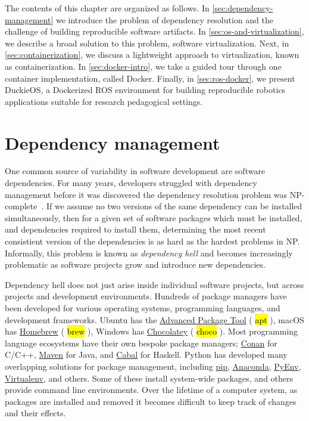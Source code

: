 \documentclass[12pt,initial,twoside,maitrise]{dms}
\newcommand{\inline}[1]{%
\begingroup%
\sethlcolor{slightgray}%
\hl{\ttfamily\small #1}%
\endgroup
}
\numberwithin{equation}{section}
\numberwithin{table}{chapter}
\numberwithin{figure}{chapter}
\begin{document}
The contents of this chapter are organized as follows. In \autoref{sec:dependency-management} we introduce the problem of dependency resolution and the challenge of building reproducible software artifacts. In \autoref{sec:os-and-virtualization}, we describe a broad solution to this problem, software virtualization. Next, in \autoref{sec:containerization}, we discuss a lightweight approach to virtualization, known as containerization. In \autoref{sec:docker-intro}, we take a guided tour through one container implementation, called Docker. Finally, in \autoref{sec:ros-docker}, we present DuckieOS, a Dockerized ROS environment for building reproducible robotics applications suitable for research pedagogical settings.

\section{Dependency management}\label{sec:dependency-management}

One common source of variability in software development are software dependencies. For many years, developers struggled with dependency management before it was discovered the dependency resolution problem was NP-complete~\citep{abate2012dependency}. If we assume no two versions of the same dependency can be installed simultaneously, then for a given set of software packages which must be installed, and dependencies required to install them, determining the most recent consistient version of the dependencies is as hard as the hardest problems in NP. Informally, this problem is known as \textit{dependency hell} and becomes increasingly problematic as software projects grow and introduce new dependencies.

Dependency hell does not just arise inside individual software projects, but across projects and development environments. Hundreds of package managers have been developed for various operating systems, programming languages, and development frameworks. Ubuntu has the \href{https://help.ubuntu.com/lts/serverguide/apt.html}{Advanced Package Tool} (\inline{apt}), macOS has \href{https://brew.sh/}{Homebrew} (\inline{brew}), Windows has \href{https://chocolatey.org/}{Chocolatey} (\inline{choco}). Most programming language ecosystems have their own bespoke package managers; \href{https://conan.io/}{Conan} for C/C++, \href{https://maven.apache.org}{Maven} for Java, and \href{https://www.haskell.org/cabal/}{Cabal} for Haskell. Python has developed many overlapping solutions for package management, including \href{https://pypi.org/project/pip/}{pip}, \href{https://www.anaconda.com/}{Anaconda}, \href{https://github.com/pyenv/pyenv}{PyEnv}, \href{https://virtualenv.pypa.io/}{Virtualenv}, and others. Some of these install system-wide packages, and others provide command line environments. Over the lifetime of a computer system, as packages are installed and removed it becomes difficult to keep track of changes and their effects.
\end{document}
